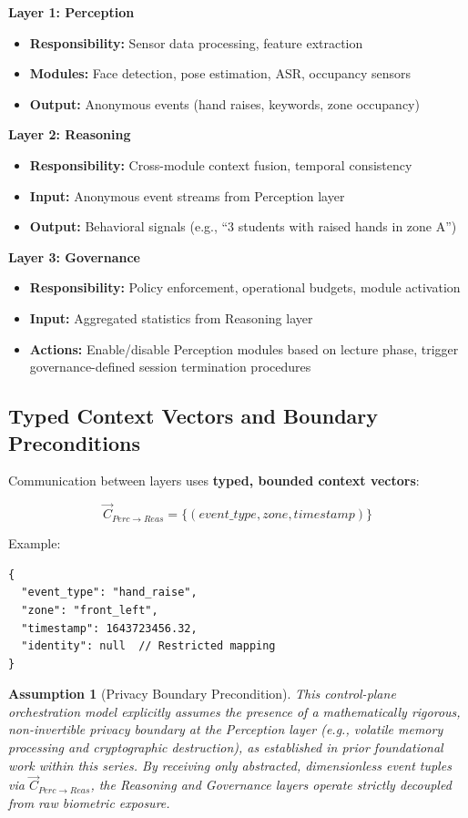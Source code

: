 \documentclass[conference]{IEEEtran}
\newtheorem{assumption}{Assumption}
\begin{document}
\textbf{Layer 1: Perception}
\begin{itemize}
    \item \textbf{Responsibility:} Sensor data processing, feature extraction
    \item \textbf{Modules:} Face detection, pose estimation, ASR, occupancy sensors
    \item \textbf{Output:} Anonymous events (hand raises, keywords, zone occupancy)
\end{itemize}

\textbf{Layer 2: Reasoning}
\begin{itemize}
    \item \textbf{Responsibility:} Cross-module context fusion, temporal consistency
    \item \textbf{Input:} Anonymous event streams from Perception layer
    \item \textbf{Output:} Behavioral signals (e.g., ``3 students with raised hands in zone A'')
\end{itemize}

\textbf{Layer 3: Governance}
\begin{itemize}
    \item \textbf{Responsibility:} Policy enforcement, operational budgets, module activation
    \item \textbf{Input:} Aggregated statistics from Reasoning layer
    \item \textbf{Actions:} Enable/disable Perception modules based on lecture phase, trigger governance-defined session termination procedures
\end{itemize}

\subsection{Typed Context Vectors and Boundary Preconditions}
Communication between layers uses \textbf{typed, bounded context vectors}:

\begin{equation}
\vec{C}_{Perc \to Reas} = \{(event\_type, zone, timestamp)\}
\end{equation}

Example:
\begin{verbatim}
{
  "event_type": "hand_raise",
  "zone": "front_left",
  "timestamp": 1643723456.32,
  "identity": null  // Restricted mapping
}
\end{verbatim}

\begin{assumption}[Privacy Boundary Precondition]
This control-plane orchestration model explicitly assumes the presence of a mathematically rigorous, non-invertible privacy boundary at the Perception layer (e.g., volatile memory processing and cryptographic destruction), as established in prior foundational work within this series. By receiving only abstracted, dimensionless event tuples via $\vec{C}_{Perc \to Reas}$, the Reasoning and Governance layers operate strictly decoupled from raw biometric exposure.
\end{assumption}
\end{document}
